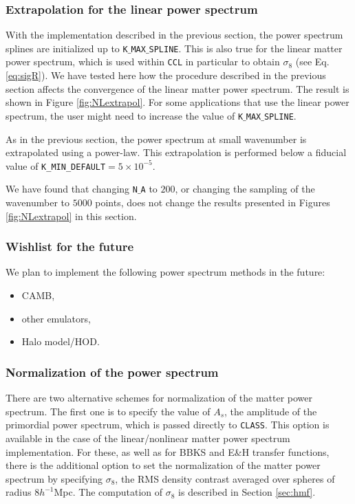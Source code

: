 \documentclass[\docopts]{\docclass}
\newcommand{\ccl}{{\tt CCL}\xspace}
\begin{document}
\subsubsection{Extrapolation for the linear power spectrum}
\label{sec:Lextrapol}

With the implementation described in the previous section, the power spectrum splines are initialized up to {\tt K$\_$MAX$\_$SPLINE}. This is also true for the linear matter power spectrum, which is used within \ccl in particular to obtain $\sigma_8$ (see Eq. \ref{eq:sigR}). We have tested here how the procedure described in the previous section affects the convergence of the linear matter power spectrum. The result is shown in Figure \ref{fig:NLextrapol}. For some applications that use the linear power spectrum, the user might need to increase the value of {\tt K$\_$MAX$\_$SPLINE}.

As in the previous section, the power spectrum at small wavenumber is extrapolated using a power-law. This extrapolation is performed below a fiducial value of {\tt K\_MIN\_DEFAULT}$=5\times 10^{-5}$.

We have found that changing {\tt N$\_$A} to $200$, or changing the sampling of the wavenumber to $5000$ points, does not change the results presented in Figures \ref{fig:NLextrapol} in this section.

\subsubsection{Wishlist for the future}
\label{Pk_wishlist}
We plan to implement the following power spectrum methods in the future:
\begin{itemize}
 \item CAMB,
 \item other emulators,
 \item Halo model/HOD.
\end{itemize}


\subsubsection{Normalization of the power spectrum}
\label{sec:PSnorm}

There are two alternative schemes for normalization of the matter power spectrum. The first one is to specify the value of $A_s$, the amplitude of the primordial power spectrum, which is passed directly to {\tt CLASS}. This option is available in the case of the linear/nonlinear matter power spectrum implementation. For these, as well as for BBKS and E\&H transfer functions, there is the additional option to set the normalization of the matter power spectrum by specifying $\sigma_8$, the RMS density contrast averaged over spheres of radius $8h^{-1}$Mpc. The computation of $\sigma_8$ is described in Section \ref{sec:hmf}.
\end{document}
